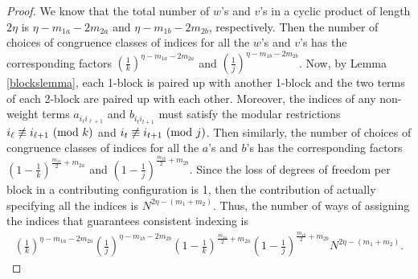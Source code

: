 \documentclass[11pt,reqno]{amsart}
\numberwithin{equation}{section}
\theoremstyle{plain}
\begin{document}
\begin{proof}
We know that the total number of $w$'s and $v$'s in a cyclic product of length $2\eta$ is $\eta-m_{1a}-2m_{2a}$ and $\eta-m_{1b}-2m_{2b}$, respectively. Then the number of choices of congruence classes of indices for all the $w$'s and $v$'s has the corresponding factors $\left(\frac{1}{k}\right)^{\eta-m_{1a}-2m_{2a}}$ and $\left(\frac{1}{j}\right)^{\eta-m_{1b}-2m_{2b}}$. Now, by Lemma \ref{blockslemma}, each 1-block is paired up with another 1-block and the two terms of each 2-block are paired up with each other. Moreover, the indices of any non-weight terms $a_{i_\ell i_{\ell+1}}$ and $b_{i_t i_{t+1}}$ must satisfy the modular restrictions $i_\ell\not\equiv i_{\ell+1}\textup{ (mod $k$)}$ and $i_t\not\equiv i_{t+1}\textup{ (mod $j$)}$. Then similarly, the number of choices of congruence classes of indices for all the $a$'s and $b$'s has the corresponding factors $\left(1-\frac{1}{k}\right)^{\frac{m_{1a}}{2}+m_{2a}}$ and $\left(1-\frac{1}{j}\right)^{\frac{m_{1b}}{2}+m_{2b}}$. Since the loss of degrees of freedom per block in a contributing configuration is 1, then the contribution of actually specifying all the indices is $N^{2\eta-(m_1+m_2)}$. Thus, the number of ways of assigning the indices that guarantees consistent indexing is
\begin{align}
\left(\frac{1}{k}\right)^{\eta-m_{1a}-2m_{2a}}\left(\frac{1}{j}\right)^{\eta-m_{1b}-2m_{2b}}\left(1-\frac{1}{k}\right)^{\frac{m_{1a}}{2}+m_{2a}}\left(1-\frac{1}{j}\right)^{\frac{m_{1b}}{2}+m_{2b}}N^{2\eta-(m_1+m_2)}.
\end{align}



\end{proof}
\end{document}
